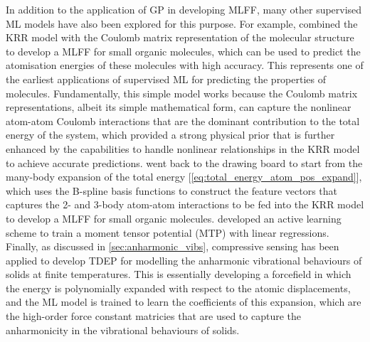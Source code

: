 In addition to the application of GP in developing MLFF, many other supervised ML models have also been explored for this purpose. For example, \citet{rupp2012fast} combined the KRR model with the Coulomb matrix representation of the molecular structure to develop a MLFF for small organic molecules, which can be used to predict the atomisation energies of these molecules with high accuracy. This represents one of the earliest applications of supervised ML for predicting the properties of molecules. Fundamentally, this simple model works because the Coulomb matrix representations, albeit its simple mathematical form, can capture the nonlinear atom-atom Coulomb interactions that are the dominant contribution to the total energy of the system, which provided a strong physical prior that is further enhanced by the capabilities to handle nonlinear relationships in the KRR model to achieve accurate predictions. \citet{xie2023ultra} went back to the drawing board to start from the many-body expansion of the total energy [\cref{eq:total_energy_atom_pos_expand}], which uses the B-spline basis functions to construct the feature vectors that captures the 2- and 3-body atom-atom interactions to be fed into the KRR model to develop a MLFF for small organic molecules. \citet{podryabinkin2017active} developed an active learning scheme to train a moment tensor potential (MTP) with linear regressions. Finally, as discussed in \cref{sec:anharmonic_vibs}, compressive sensing has been applied to develop TDEP\cite{hellman2013temperature,zhou2019compressive} for modelling the anharmonic vibrational behaviours of solids at finite temperatures. This is essentially developing a forcefield in which the energy is polynomially expanded with respect to the atomic displacements, and the ML model is trained to learn the coefficients of this expansion, which are the high-order force constant matricies that are used to capture the anharmonicity in the vibrational behaviours of solids.

